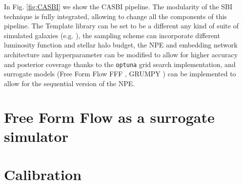 In Fig. \ref{fig:CASBI} we show the CASBI pipeline. The modularity of the SBI technique is fully integrated, allowing to change all the components of this pipeline. The Template library can be set to be a different any kind of suite of simulated galaxies (e.g. \cite{pillepichMilkyWayAndromeda2023}), the sampling scheme can incorporate different luminosity function and stellar halo budget, the NPE and embedding network architecture and hyperparameter can be modified to allow for higher accuracy and posterior coverage thanks to the \texttt{optuna} grid search implementation, and surrogate models (Free Form Flow FFF \cite{draxlerFreeformFlowsMake2024}, GRUMPY \cite{kravtsovGRUMPYSimpleFramework2022}) can be implemented to allow for the sequential version of the NPE.      


\section{Free Form Flow as a surrogate simulator}

\section{Calibration}


